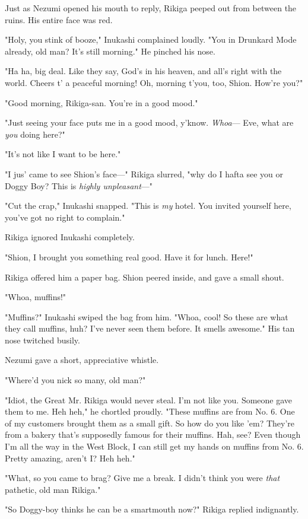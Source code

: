 Just as Nezumi opened his mouth to reply, Rikiga peeped out from between
the ruins. His entire face was red.

"Holy, you stink of booze," Inukashi complained loudly. "You in Drunkard
Mode already, old man? It's still morning." He pinched his nose.

"Ha ha, big deal. Like they say, God's in his heaven, and all's right
with the world. Cheers t' a peaceful morning! Oh, morning t'you, too,
Shion. How're you?"

"Good morning, Rikiga-san. You're in a good mood."

"Just seeing your face puts me in a good mood, y'know. \emph{Whoa}--- Eve, what
are \emph{you} doing here?"

"It's not like I want to be here."

"I jus' came to see Shion's face---" Rikiga slurred, "why do I hafta see
you or Doggy Boy? This is \emph{highly unpleasant}---"

"Cut the crap," Inukashi snapped. "This is \emph{my} hotel. You invited
yourself here, you've got no right to complain."

Rikiga ignored Inukashi completely.

"Shion, I brought you something real good. Have it for lunch. Here!"

Rikiga offered him a paper bag. Shion peered inside, and gave a small
shout.

"Whoa, muffins!"

"Muffins?" Inukashi swiped the bag from him. "Whoa, cool! So these are
what they call muffins, huh? I've never seen them before. It smells
awesome." His tan nose twitched busily.

Nezumi gave a short, appreciative whistle.

"Where'd you nick so many, old man?"

"Idiot, the Great Mr. Rikiga would never steal. I'm not like you.
Someone gave them to me. Heh heh," he chortled proudly. "These muffins
are from No. 6. One of my customers brought them as a small gift. So how
do you like 'em? They're from a bakery that's supposedly famous for
their muffins. Hah, see? Even though I'm all the way in the West Block,
I can still get my hands on muffins from No. 6. Pretty amazing, aren't
I? Heh heh."

"What, so you came to brag? Give me a break. I didn't think you were
\emph{that} pathetic, old man Rikiga."

"So Doggy-boy thinks he can be a smartmouth now?" Rikiga replied
indignantly.

